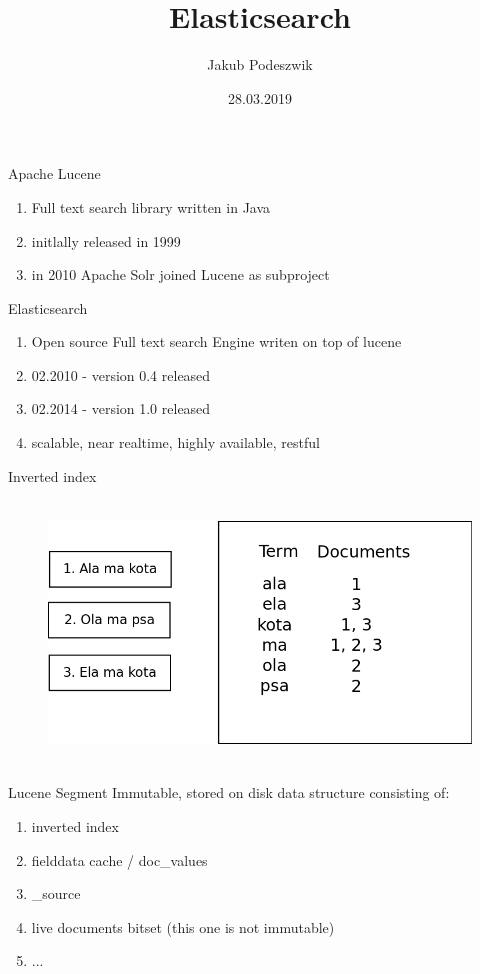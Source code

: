 \documentclass{beamer}
\title[Elasticsearch]{Elasticsearch}
\author{Jakub Podeszwik}
\institute{Yameo}
\date{28.03.2019}
\begin{document}
\begin{frame}
  \titlepage
\end{frame}

\begin{frame}{Apache Lucene}
	\begin{enumerate}
		\item Full text search library written in Java
		\item initlally released in 1999
		\item in 2010 Apache Solr joined Lucene as subproject
	\end{enumerate}
\end{frame}
\begin{frame}{Elasticsearch}
	\begin{enumerate}
		\item Open source Full text search Engine writen on top of lucene
		\item 02.2010 - version 0.4 released
		\item 02.2014 - version 1.0 released
		\item scalable, near realtime, highly available, restful
	\end{enumerate}
\end{frame}
\begin{frame}{Inverted index}
	\begin{figure}
		\includegraphics[width=\textwidth,height=7cm,keepaspectratio=true]{inverted-index}
	\end{figure}
\end{frame}

\begin{frame}{Lucene Segment}
	Immutable, stored on disk data structure consisting of:
	\begin{enumerate}
		\item inverted index
		\item fielddata cache / doc\_values
		\item \_source
		\item live documents bitset (this one is not immutable)
		\item ...
	\end{enumerate}
\end{frame}
\end{document}
